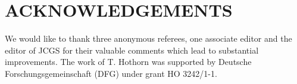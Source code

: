 
\section*{ACKNOWLEDGEMENTS}

We would like to thank three anonymous referees, one associate editor and
the editor of JCGS for their valuable comments which lead to substantial
improvements. The work of T. Hothorn was supported by Deutsche 
Forschungsgemeinschaft (DFG) under grant HO 3242/1-1. 

